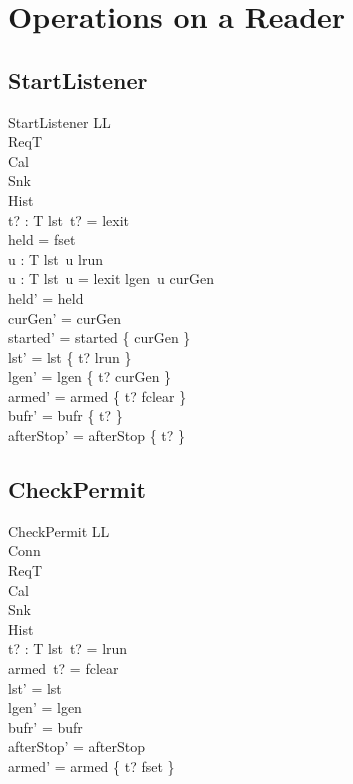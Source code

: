 \documentclass[a4paper,10pt,fleqn]{article}
\begin{document}
\section{Operations on a Reader}

\subsection{StartListener}

\begin{schema}{StartListener}
  \Delta LL \\
  \Xi ReqT \\
  \Xi Cal \\
  \Xi Snk \\
  \Xi Hist \\
  t? : T
\where
  lst~t? = lexit \\
  held = fset \\
  \forall u : T \spot lst~u \neq lrun \\
  \forall u : T \spot lst~u = lexit \lor lgen~u \neq curGen \\
  held' = held \\
  curGen' = curGen \\
  started' = started \cup \{ curGen \} \\
  lst' = lst \oplus \{ t? \mapsto lrun \} \\
  lgen' = lgen \oplus \{ t? \mapsto curGen \} \\
  armed' = armed \oplus \{ t? \mapsto fclear \} \\
  bufr' = bufr \oplus \{ t? \mapsto \emptyset \} \\
  afterStop' = afterStop \oplus \{ t?  \}
\end{schema}

\subsection{CheckPermit}

\begin{schema}{CheckPermit}
  \Delta LL \\
  \Xi Conn \\
  \Xi ReqT \\
  \Xi Cal \\
  \Xi Snk \\
  \Xi Hist \\
  t? : T
\where
  lst~t? = lrun \\
  armed~t? = fclear \\
  lst' = lst \\
  lgen' = lgen \\
  bufr' = bufr \\
  afterStop' = afterStop \\
  armed' = armed \oplus \{ t? \mapsto fset \}
\end{schema}
\end{document}
